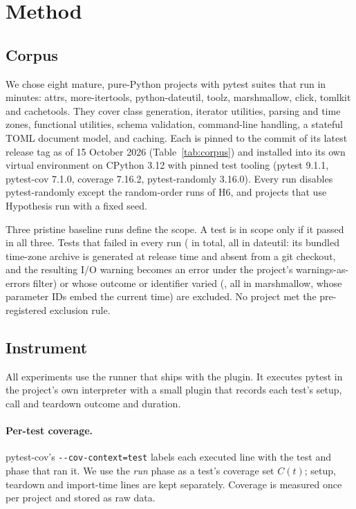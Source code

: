 \section{Method}
\label{sec:method}

\subsection{Corpus}

We chose eight mature, pure-Python projects with pytest suites that run in minutes: attrs, more-itertools, python-dateutil, toolz, marshmallow, click, tomlkit and cachetools. They cover class generation, iterator utilities, parsing and time zones, functional utilities, schema validation, command-line handling, a stateful TOML document model, and caching. Each is pinned to the commit of its latest release tag as of 15 October 2026 (Table~\ref{tab:corpus}) and installed into its own virtual environment on CPython 3.12 with pinned test tooling (pytest 9.1.1, pytest-cov 7.1.0, coverage 7.16.2, pytest-randomly 3.16.0). Every run disables pytest-randomly except the random-order runs of H6, and projects that use Hypothesis run with a fixed seed.

Three pristine baseline runs define the scope. A test is in scope only if it passed in all three. Tests that failed in every run (\NBaselineFailing{} in total, all in dateutil: its bundled time-zone archive is generated at release time and absent from a git checkout, and the resulting I/O warning becomes an error under the project's warnings-as-errors filter) or whose outcome or identifier varied (\NBaselineVarying{}, all in marshmallow, whose parameter IDs embed the current time) are excluded. No project met the pre-registered exclusion rule.



\subsection{Instrument}

All experiments use the runner that ships with the plugin. It executes pytest in the project's own interpreter with a small plugin that records each test's setup, call and teardown outcome and duration.

\paragraph{Per-test coverage.} pytest-cov's \texttt{-{}-cov-context=test} labels each executed line with the test and phase that ran it. We use the \emph{run} phase as a test's coverage set $C(t)$; setup, teardown and import-time lines are kept separately. Coverage is measured once per project and stored as raw data.

